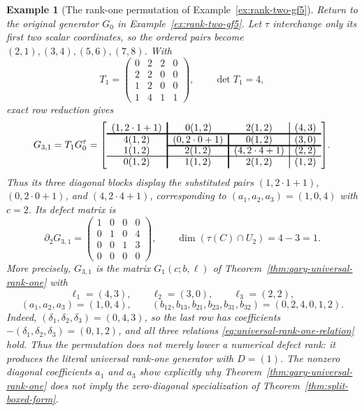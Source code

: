 \documentclass[12pt]{article}
\newtheorem{example}{Example}[section]
\begin{document}
\begin{example}[The rank-one permutation of
Example~\ref{ex:rank-two-gf5}]
\label{ex:rank-one-permutation-gf5}
\rm
Return to the original generator \(G_0\) in
Example~\ref{ex:rank-two-gf5}. Let \(\tau\) interchange only its first two
scalar coordinates, so the ordered pairs become
\((2,1),(3,4),(5,6),(7,8)\). With
\[
T_1=\begin{pmatrix}
0&2&2&0\\
2&2&0&0\\
1&2&0&0\\
1&4&1&1
\end{pmatrix},\qquad \det T_1=4,
\]
exact row reduction gives
\[
G_{3,1}=T_1G_0^\tau=
{\arrayrulewidth=1.2pt
\left[\begin{array}{c!{\vrule width 1.2pt}c!{\vrule width 1.2pt}c!{\vrule width 0.6pt}c}
(1,2\cdot1+1)&\multicolumn{1}{c}{0(1,2)}&2(1,2)&(4,3)\\[-1pt]
\noalign{\hrule height 1.2pt}
4(1,2)&(0,2\cdot0+1)&0(1,2)&(3,0)\\[-1pt]
\cline{2-4}
1(1,2)&2(1,2)&(4,2\cdot4+1)&(2,2)\\[-1pt]
\noalign{\hrule height 0.6pt}
0(1,2)&1(1,2)&2(1,2)&(1,2)
\end{array}\right]}.
\]
Thus its three diagonal blocks display the substituted pairs
\((1,2\cdot1+1)\), \((0,2\cdot0+1)\), and
\((4,2\cdot4+1)\), corresponding to
\((a_1,a_2,a_3)=(1,0,4)\) with \(c=2\). Its defect matrix is
\[
\partial_2G_{3,1}=
\begin{pmatrix}
1&0&0&0\\
0&1&0&4\\
0&0&1&3\\
0&0&0&0
\end{pmatrix},
\qquad
\dim(\tau(C)\cap U_2)=4-3=1.
\]
More precisely, \(G_{3,1}\) is the matrix \(G_1(c;b,\ell)\) of
Theorem~\ref{thm:qary-universal-rank-one} with
\[
\ell_1=(4,3),\qquad \ell_2=(3,0),\qquad \ell_3=(2,2),
\]
\[
(a_1,a_2,a_3)=(1,0,4),\qquad
(b_{12},b_{13},b_{21},b_{23},b_{31},b_{32})=(0,2,4,0,1,2).
\]
Indeed, \((\delta_1,\delta_2,\delta_3)=(0,4,3)\), so the last row has
coefficients \(-(\delta_1,\delta_2,\delta_3)=(0,1,2)\), and all three
relations \eqref{eq:universal-rank-one-relation} hold. Thus the permutation
does not merely lower a numerical defect rank: it produces the literal
universal rank-one generator with \(D=(1)\). The nonzero diagonal
coefficients \(a_1\) and \(a_3\) show explicitly why
Theorem~\ref{thm:qary-universal-rank-one} does not imply the zero-diagonal
specialization of Theorem~\ref{thm:split-boxed-form}.
\end{example}
\end{document}

